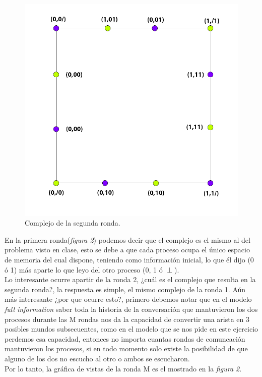 \documentclass{article}
\begin{document}
\begin{enumerate}
{\begin{enumerate}
{      \begin{figure}
        \centering
        \includegraphics[scale=0.26]{3a_protocol.png}
        \caption{Complejo de la segunda ronda.}
      \end{figure}
          
      En la primera ronda(\textit{figura 2}) podemos decir que el complejo es el mismo
      al del problema visto en clase, esto se debe a que cada proceso ocupa el único espacio
      de memoria del cual dispone, teniendo como información inicial, lo que él dijo (0 ó 1)
      más aparte lo que leyo del otro proceso (0, 1 ó $\perp$).\\
      Lo interesante ocurre apartir de la ronda 2, ¿cuál es el complejo que resulta en la segunda
      ronda?, la respuesta es simple, el mismo complejo de la ronda 1. Aún más interesante
      ¿por que ocurre esto?, primero debemos notar que en el modelo \textit{full information} 
      saber toda la historia de la conversación que mantuvieron los dos procesos durante las M
      rondas nos da la capacidad de convertir una arista en 3 posibles mundos subsecuentes,
      como en el modelo que se nos pide en este ejercicio perdemos esa capacidad, entonces 
      no importa cuantas rondas de comuncación mantuvieron los procesos, si en todo momento solo
      existe la posibilidad de que alguno de los dos no escucho al otro o ambos se escucharon.\\
      Por lo tanto, la gráfica de vistas de la ronda M es el mostrado en la \textit{figura 2}.\\
    }
       

\end{enumerate}}
\end{enumerate}
\end{document}
